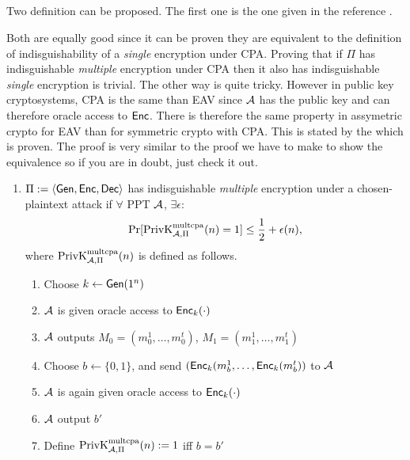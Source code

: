 \subsection{}
\begin{solution}
  Two definition can be proposed.
  The first one is the one given in the reference \cite[p.~84]{katz2007introduction}.

  Both are equally good since it can be proven they are equivalent to the definition of indisguishability of a \emph{single} encryption
  under CPA.
  Proving that if $\Pi$ has indisguishable \emph{multiple} encryption under CPA then it also has indisguishable \emph{single} encryption
  is trivial.
  The other way is quite tricky.
  However in public key cryptosystems, CPA is the same than EAV since $\mathcal{A}$ has the public key and can therefore oracle access to $\operatorname{\mathsf{Enc}}$.
  There is therefore the same property in assymetric crypto for EAV than for symmetric crypto with CPA.
  This is stated by the \cite[theorem~10.10]{katz2007introduction} which is proven.
  The proof is very similar to the proof we have to make to show the equivalence so if you are in doubt, just check it out.

  \begin{enumerate}

    \item
      $\Pi := \langle\operatorname{\mathsf{Gen}}, \operatorname{\mathsf{Enc}}, \operatorname{\mathsf{Dec}}\rangle$ has indisguishable \emph{multiple} encryption under a chosen-plaintext attack
      if $\forall$ PPT $\mathcal{A}$, $\exists \epsilon$:
      \[ \Pr[\operatorname{PrivK}^{\text{multcpa}}_{\mathcal{A},\Pi}(n) = 1] \leq \frac{1}{2} + \epsilon(n), \]
      where $\operatorname{PrivK}^{\text{multcpa}}_{\mathcal{A},\Pi}(n)$ is defined as follows.
      \begin{enumerate}
        \item Choose $k \leftarrow \operatorname{\mathsf{Gen}}(1^n)$
        \item $\mathcal{A}$ is given oracle access to $\operatorname{\mathsf{Enc}}_k(\cdot)$
        \item $\mathcal{A}$ outputs $M_0 = (m_0^1, \ldots, m_0^t)$, $M_1 = (m_1^1, \ldots, m_1^t)$
        \item Choose $b \leftarrow \{0,1\}$, and send $(\operatorname{\mathsf{Enc}}_k(m_b^1, \ldots, \operatorname{\mathsf{Enc}}_k(m_b^t))$ to $\mathcal{A}$
        \item $\mathcal{A}$ is again given oracle access to $\operatorname{\mathsf{Enc}}_k(\cdot)$
        \item $\mathcal{A}$ output $b'$
        \item Define $\operatorname{PrivK}^{\text{multcpa}}_{\mathcal{A},\Pi}(n) := 1$ iff $b = b'$
      \end{enumerate}
	


\end{enumerate}
\end{solution}
